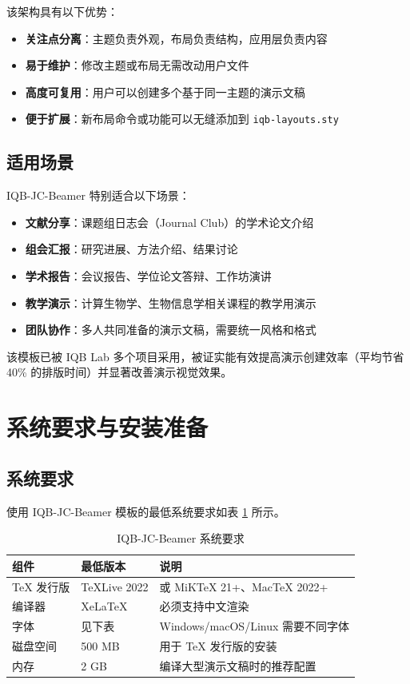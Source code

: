 该架构具有以下优势：

\begin{itemize}
    \item \textbf{关注点分离}：主题负责外观，布局负责结构，应用层负责内容
    \item \textbf{易于维护}：修改主题或布局无需改动用户文件
    \item \textbf{高度可复用}：用户可以创建多个基于同一主题的演示文稿
    \item \textbf{便于扩展}：新布局命令或功能可以无缝添加到 \lstinline|iqb-layouts.sty|
\end{itemize}

\subsection{适用场景}

IQB-JC-Beamer 特别适合以下场景：

\begin{itemize}
    \item \textbf{文献分享}：课题组日志会（Journal Club）的学术论文介绍
    \item \textbf{组会汇报}：研究进展、方法介绍、结果讨论
    \item \textbf{学术报告}：会议报告、学位论文答辩、工作坊演讲
    \item \textbf{教学演示}：计算生物学、生物信息学相关课程的教学用演示
    \item \textbf{团队协作}：多人共同准备的演示文稿，需要统一风格和格式
\end{itemize}

该模板已被 IQB Lab 多个项目采用，被证实能有效提高演示创建效率（平均节省 40\% 的排版时间）并显著改善演示视觉效果。

\section{系统要求与安装准备}

\subsection{系统要求}

使用 IQB-JC-Beamer 模板的最低系统要求如表 \ref{tab:requirements} 所示。

\begin{table}[h]
\centering
\caption{IQB-JC-Beamer 系统要求}
\label{tab:requirements}
\begin{tabular}{p{2.5cm}p{3cm}p{8cm}}
\toprule
\textbf{组件} & \textbf{最低版本} & \textbf{说明} \\
\midrule
TeX 发行版 & TeXLive 2022 & 或 MiKTeX 21+、MacTeX 2022+ \\
编译器 & XeLaTeX & 必须支持中文渲染 \\
字体 & 见下表 & Windows/macOS/Linux 需要不同字体 \\
磁盘空间 & 500 MB & 用于 TeX 发行版的安装 \\
内存 & 2 GB & 编译大型演示文稿时的推荐配置 \\
\bottomrule
\end{tabular}
\end{table}

